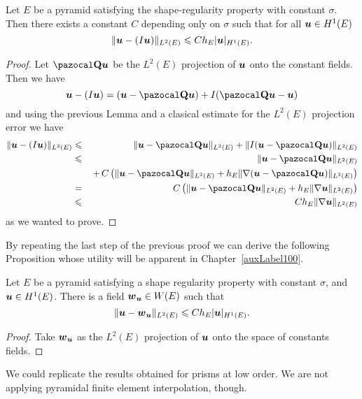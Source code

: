 \begin{proposition}\label{propErrorInterpolacionPiramidesTetraedros}
Let $E$ be a pyramid satisfying the shape-regularity property with constant $\sigma$.
Then there exists a constant $C$ depending only on $\sigma$ such that 
for all $\boldsymbol{u}\in H^1(E)$
\[
\|\boldsymbol{u}-(I\boldsymbol{u})\|_{L^2(E)}\leqslant C h_E|\boldsymbol{u}|_{H^1(E)}.
\]
\end{proposition}
\begin{proof} Let $\Qbb\bu$ be the $L^2(E)$ projection of $\boldsymbol{u}$ onto the 
constant fields. Then we have
\[
\bu-(I\bu) = (\bu - \Qbb\bu) + I(\Qbb\bu-\bu)
\]
and using the previous Lemma and a clasical estimate for the $L^2(E)$ projection
error we have
\begin{eqnarray*}
  \|\bu-(I\bu)\|_{L^2(E)} &\leqslant& \|\bu - \Qbb\bu\|_{L^2(E)} + 
    \|I(\bu-\Qbb\bu)\|_{L^2(E)}\\ 
  &\leqslant& \|\bu - \Qbb\bu\|_{L^2(E)}\\
  &&\, + \, C \left(\|\bu-\Qbb\bu\|_{L^2(E)} + 
  h_E\|\nabla(\bu-\Qbb\bu)\|_{L^2(E)}\right)\\ 
  & = & C\left(\|\bu-\Qbb\bu\|_{L^2(E)} + h_E\|\nabla\bu\|_{L^2(E)}\right)\\
  & \leqslant & C h_E \|\nabla\bu\|_{L^2(E)}
\end{eqnarray*}
as we wanted to prove.
\end{proof} 
By repeating the last step of the previous proof we can derive the following Proposition
whose utility will be apparent in Chapter~\ref{auxLabel100}.
\begin{proposition}\label{propupi}
Let $E$ be a pyramid satisfying a shape regularity property with constant 
$\sigma$, and $\boldsymbol{u}\in H^1(E)$. 
There is a field $\boldsymbol{w}_{\boldsymbol{u}}\in W(E)$ such that
\[
  \|\boldsymbol{u}-\boldsymbol{w}_{\boldsymbol{u}}\|_{L^2(E)} \leqslant C h_E |\boldsymbol{u}|_{H^1(E)}.
\]
\end{proposition}
\begin{proof}
Take $\boldsymbol{w}_{\boldsymbol{u}}$
as the $L^2(E)$ projection of $\boldsymbol{u}$ onto the space of constants fields.
\end{proof}
\begin{remark}
  We could replicate the results obtained for prisms at low order. We are not
  applying pyramidal finite element interpolation, though.
\end{remark}